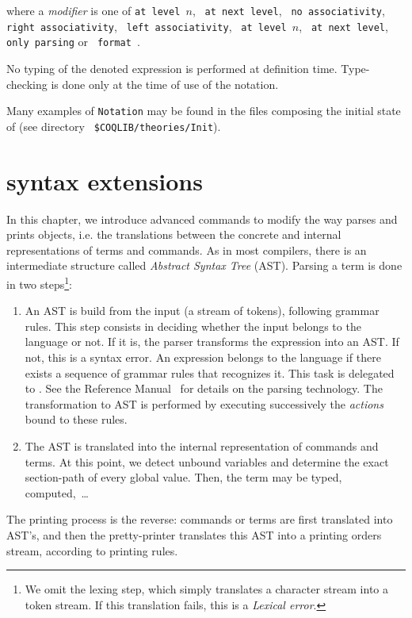 where a {\em modifier} is one of \texttt{at level $n$},
\texttt{ at next level},
\texttt{ no associativity}, \texttt{ right
associativity}, \texttt{ left associativity}, 
\texttt{ \nelist{\ident}{,} at level $n$},
\texttt{ \nelist{\ident}{,} at next level}, \texttt{ only parsing} or
\texttt{ format {\str}}.

\Rem No typing of the denoted expression is performed at definition
time. Type-checking is done only at the time of use of the notation.

\Rem Many examples of {\tt Notation} may be found in the files
composing the initial state of {\Coq} (see directory {\tt
\$COQLIB/theories/Init}).

%

\iffalse
\chapter{syntax extensions}
\label{Addoc-syntax}

In this chapter, we introduce advanced commands to modify the way
{\Coq} parses and prints objects, i.e. the translations between the
concrete and internal representations of terms and commands. As in
most compilers, there is an intermediate structure called {\em Abstract
Syntax Tree} (AST). Parsing a term is done in two steps\footnote{
  We omit the lexing step, which simply translates a character stream
  into a token stream. If this translation fails, this is a
  \emph{Lexical error}.
}:
\begin{enumerate}
\item An AST is build from the input (a stream of tokens), following
  grammar rules. This step consists in deciding whether the input
  belongs to the language or not. If it is, the parser transforms the
  expression into an AST. If not, this is a syntax error. An expression
  belongs to the language if there exists a sequence of grammar rules
  that recognizes it. This task is delegated to {\camlpppp}. See the
  Reference Manual~\cite{ddr98} for details on the parsing
  technology. The transformation to AST is performed by executing
  successively the {\sl actions} bound to these rules.
  
\item The AST is translated into the internal representation of
  commands and terms. At this point, we detect unbound variables and
  determine the exact section-path of every global value. Then, the term
  may be typed, computed,~\ldots
\end{enumerate}
The printing process is the reverse: commands or terms are first
translated into AST's, and then the pretty-printer translates this AST
into a printing orders stream, according to printing rules.

